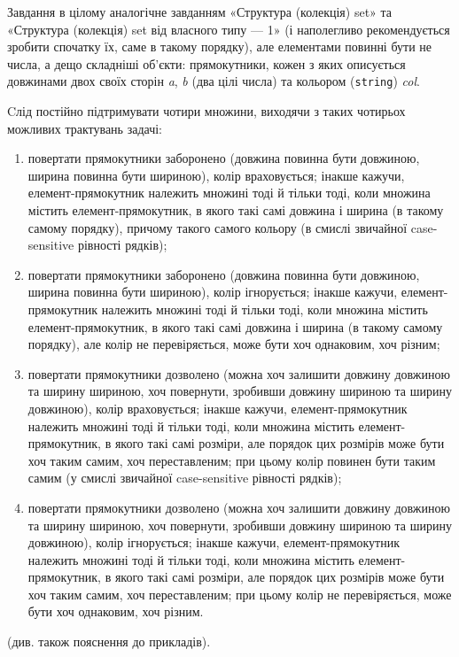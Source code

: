 ﻿ Завдання в цілому аналогічне завданням «Структура (колекція) set» та «Структура (колекція) set від власного типу — 1» (і наполегливо рекомендується зробити спочатку їх, саме в такому порядку), але елементами повинні бути не числа, а дещо складніші об'єкти: прямокутники, кожен з яких описується довжинами двох своїх сторін {\it a}, {\it b} (два цілі числа) та кольором ({\tt string}) {\it col}. 

 Cлід постійно підтримувати чотири множини, виходячи з таких чотирьох можливих трактувань задачі:
\begin{enumerate}
\item
    повертати прямокутники заборонено (довжина повинна бути довжиною, ширина повинна бути шириною), колір враховується; інакше кажучи, елемент-прямокутник належить множині тоді й тільки тоді, коли множина містить елемент-прямокутник, в якого такі самі довжина і ширина (в такому самому порядку), причому такого самого кольору (в смислі звичайної case-sensitive рівності рядків);
\item
    повертати прямокутники заборонено (довжина повинна бути довжиною, ширина повинна бути шириною), колір ігнорується; інакше кажучи, елемент-прямокутник належить множині тоді й тільки тоді, коли множина містить елемент-прямокутник, в якого такі самі довжина і ширина (в такому самому порядку), але колір не перевіряється, може бути хоч однаковим, хоч різним;
\item
    повертати прямокутники дозволено (можна хоч залишити довжину довжиною та ширину шириною, хоч повернути, зробивши довжину шириною та ширину довжиною), колір враховується; інакше кажучи, елемент-прямокутник належить множині тоді й тільки тоді, коли множина містить елемент-прямокутник, в якого такі самі розміри, але порядок цих розмірів може бути хоч таким самим, хоч переставленим; при цьому колір повинен бути таким самим (у смислі звичайної case-sensitive рівності рядків);
\item
    повертати прямокутники дозволено (можна хоч залишити довжину довжиною та ширину шириною, хоч повернути, зробивши довжину шириною та ширину довжиною), колір ігнорується; інакше кажучи, елемент-прямокутник належить множині тоді й тільки тоді, коли множина містить елемент-прямокутник, в якого такі самі розміри, але порядок цих розмірів може бути хоч таким самим, хоч переставленим; при цьому колір не перевіряється, може бути хоч однаковим, хоч різним.
\end{enumerate}

(див. також пояснення до прикладів). 

